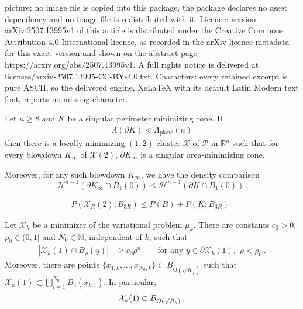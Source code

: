 \documentclass[10pt,a4paper]{amsart}
\DeclareMathOperator{\plane}{plane}
\newcommand{\Hcal}{\mathcal{H}}
\newcommand{\Orm}{\mathrm{O}}
\newcommand{\Pcal}{\mathcal{P}}
\newcommand{\R}{\mathbb{R}}
\newcommand{\X}{\mathcal{X}}
\begin{document}
picture; no image file is copied into this package, the package declares no asset dependency and no image file is redistributed with it. Licence: version arXiv:2507.13995v1 of this article is distributed under the Creative Commons Attribution 4.0 International licence, as recorded in the arXiv licence metadata for this exact version and shown on the abstract page https://arxiv.org/abs/2507.13995v1. A full rights notice is delivered at licenses/arxiv-2507.13995-CC-BY-4.0.txt. Characters: every retained excerpt is pure ASCII, so the delivered engine, XeLaTeX with its default Latin Modern text font, reports no missing character.
\begin{theorem}\label{t:higher-dim}
    Let $n \geq 8$ and {$K$ be a singular perimeter minimizing cone}. If
    \begin{align}\label{eq:comp assump in thm}
    \Lambda({\partial K}) < \Lambda_{\plane}(n)    
    \end{align}
    then there is a locally minimizing $(1,2)$-cluster $\X$ of $\Pcal$ in $\R^n$ such that for every blowdown $K_\infty$ of $\X(2)$, $ \partial K_\infty$ is a singular area-minimizing cone.

    Moreover, for any such blowdown $K_\infty$, we have the density comparison
    \begin{equation}\label{e:cone-density-comparison}
        \Hcal^{n-1}(\partial K_\infty\cap B_1(0)) \leq \Hcal^{n-1}(\partial K\cap B_1(0))\,.
    \end{equation}
\end{theorem}

\begin{align}\label{eq:good bound on 3R}
    P(\X_R(2);B_{3R})\leq P(B) + P(K;B_{3R})\,.
\end{align}

\begin{lemma}\label{lem: density estimates}
    Let $\mathcal{X}_{k}$ be a minimizer of the variational problem $\mu_{k}$. There are constants $c_0>0$, $\rho_0\in (0,1]$ {and $N_0\in \mathbb{N}$}, independent of $k$, such that 
    \begin{align}
        \label{eqn: lower denisty estimate}
    |\mathcal{X}_k(1) \cap B_\rho(y)| &\geq c_0 \rho^n\qquad \mbox{for any } y\in \partial \X_k(1),\,\, \rho < \rho_0 \,.
        \end{align} 
{Moreover, there are points 
$\{x_{1,k},\dots ,x_{N_0, k}\} \subset B_{{ \Orm(\sqrt{R}_k)}}$
such that $\X_k(1) \subset \bigcup_{i=1}^{N_0} {B_4}(x_{k,i})$. In particular,}
\begin{align}\label{eq:nonsaturation}
    \X_k(1) \subset B_{{{\rm O}(\sqrt{R_k})}}\,.
\end{align}
\end{lemma}
\end{document}
